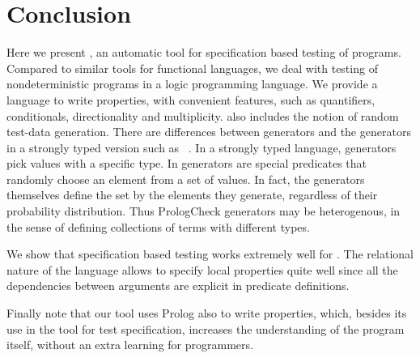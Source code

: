 
\section{Conclusion}
\label{sec:conclusion}

Here we present \plqc{}, an automatic tool for specification based
testing of \Prolog programs.
%
Compared to similar tools for functional languages, we deal with testing
of nondeterministic programs in a logic programming language.
%
We provide a language to write properties, with convenient features,
such as quantifiers, conditionals, directionality and multiplicity.
%
\plqc{} also includes the notion of random test-data generation.
%
There are differences between \plqc{} generators and the generators
in a strongly typed version such as \Haskell\ \QuickCheck.
%
In a strongly typed language, generators pick values with a specific
type.
%
In \plqc{} generators are special predicates that randomly choose an
element from a set of values.
%
In fact, the generators themselves define the set by the elements they
generate, regardless of their probability distribution.
%
Thus PrologCheck generators may be heterogenous, in the sense of
defining collections of terms with different types.


We show that specification based testing works extremely well for
\Prolog.
%
The relational nature of the language allows to specify local properties
quite well since all the dependencies between arguments are explicit in
predicate definitions.


Finally note that our tool uses Prolog also to write properties, which,
besides its use in the tool for test specification, increases the
understanding of the program itself, without an extra learning for
\Prolog{} programmers.
